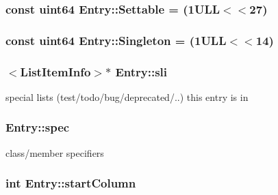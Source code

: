 \subsubsection[{Settable}]{\setlength{\rightskip}{0pt plus 5cm}const {\bf uint64} Entry\+::\+Settable = (1\+U\+L\+L$<$$<$27)\hspace{0.3cm}{\ttfamily [static]}}\label{class_entry_afce6228666d983de4eb2c817ab80c035}
\hypertarget{class_entry_a0d43729e0fcbde5bb4ab3a7f955a8414}{}
\subsubsection[{Singleton}]{\setlength{\rightskip}{0pt plus 5cm}const {\bf uint64} Entry\+::\+Singleton = (1\+U\+L\+L$<$$<$14)\hspace{0.3cm}{\ttfamily [static]}}\label{class_entry_a0d43729e0fcbde5bb4ab3a7f955a8414}
\hypertarget{class_entry_a5328bd7f1580a30ad2345840044c2a4b}{}
\subsubsection[{sli}]{$<${\bf List\+Item\+Info}$>$$\ast$ Entry\+::sli}\label{class_entry_a5328bd7f1580a30ad2345840044c2a4b}


special lists (test/todo/bug/deprecated/..) this entry is in 

\hypertarget{class_entry_a3019e7d39a5c382fb924e22913198133}{}
\subsubsection[{spec}]{ Entry\+::spec}\label{class_entry_a3019e7d39a5c382fb924e22913198133}


class/member specifiers 

\hypertarget{class_entry_a59c06b1f3be3c3220404df1d3fdc5bfb}{}
\subsubsection[{start\+Column}]{\setlength{\rightskip}{0pt plus 5cm}int Entry\+::start\+Column}\label{class_entry_a59c06b1f3be3c3220404df1d3fdc5bfb}


